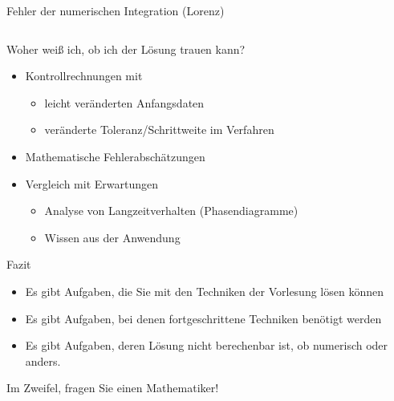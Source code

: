\documentclass[notheorems,hidelinks,aspectratio=1610]{beamer}
\begin{document}
\begin{frame}{Fehler der numerischen Integration (Lorenz)}
\begin{columns}
\begin{column}{.6\textwidth}
    \end{column}
  \end{columns}
\end{frame}

\begin{frame}{Woher weiß ich, ob ich der Lösung trauen kann?}
  \begin{itemize}
  \item Kontrollrechnungen mit
    \begin{itemize}
    \item leicht veränderten Anfangsdaten
    \item veränderte Toleranz/Schrittweite im Verfahren
    \end{itemize}
  \item Mathematische Fehlerabschätzungen
  \item Vergleich mit Erwartungen
    \begin{itemize}
    \item Analyse von Langzeitverhalten (Phasendiagramme)
    \item Wissen aus der Anwendung
    \end{itemize}
  \end{itemize}
\end{frame}

\begin{frame}{Fazit}
  \begin{itemize}
  \item Es gibt Aufgaben, die Sie mit den Techniken der Vorlesung lösen können
  \item Es gibt Aufgaben, bei denen fortgeschrittene Techniken benötigt werden
  \item Es gibt Aufgaben, deren Lösung nicht berechenbar ist, ob numerisch oder anders.
  \end{itemize}
  \pause
  \begin{center}
    Im Zweifel, fragen Sie einen Mathematiker!
  \end{center}
\end{frame}
\end{document}
